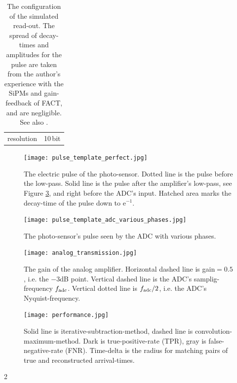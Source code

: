 \documentclass{article}%
\begin{document}
\begin{multicols}{2}
\begin{table}[H]
\begin{center}
\begin{tabular}{lr}
            resolution & 10\,bit\\
        \end{tabular}
        \caption{%
The configuration of the simulated read-out. The spread of decay-times and amplitudes for the pulse are taken from the author's experience with the SiPMs and gain-feedback of FACT, and are negligible. See also \cite{fact-performance}.
}
        \label{TabReadOutConfig}
    \end{center}
\end{table}
%
\begin{figure}[H]%
\centering%
\texttt{[image: pulse\_template\_perfect.jpg]}%
\caption{
The electric pulse of the photo-sensor.
%
Dotted line is the pulse before the low-pass.
%
Solid line is the pulse after the amplifier's low-pass, see Figure \ref{FigSimAnalogTransmission}, and right before the ADC's input.
%
Hatched area marks the decay-time of the pulse down to $\mathrm{e}^{-1}$.
}%
\label{FigSimPulseTemplate}
\end{figure}
%
\begin{figure}[H]%
\centering%
\texttt{[image: pulse\_template\_adc\_various\_phases.jpg]}%
\caption{
The photo-sensor's pulse seen by the ADC with various phases.
}%
\label{FigSimPulsePhases}
\end{figure}
%
\begin{figure}[H]%
\centering%
\texttt{[image: analog\_transmission.jpg]}%
\caption{
The gain of the analog amplifier.
%
Horizontal dashed line is gain$=0.5$, i.e. the $-3$dB point.
%
Vertical dashed line is the ADC's samplig-frequency $f_\text{adc}{}$.
%
Vertical dotted line is $f_\text{adc}{}/2$, i.e. the ADC's Nyquist-frequency.
}%
\label{FigSimAnalogTransmission}
\end{figure}
%
\begin{figure}[H]%
\centering%
\texttt{[image: performance.jpg]}%
\caption{%
Solid line is iterative-subtraction-method, dashed line is convolution-maximum-method.
%
Dark is true-positive-rate (TPR), gray is false-negative-rate (FNR).
%
Time-delta is the radius for matching pairs of true and reconstructed arrival-times.
}%
\label{FigSimPerformanceVsNsb}
\end{figure}
%
%
%
\end{multicols}{2}%
\end{document}
